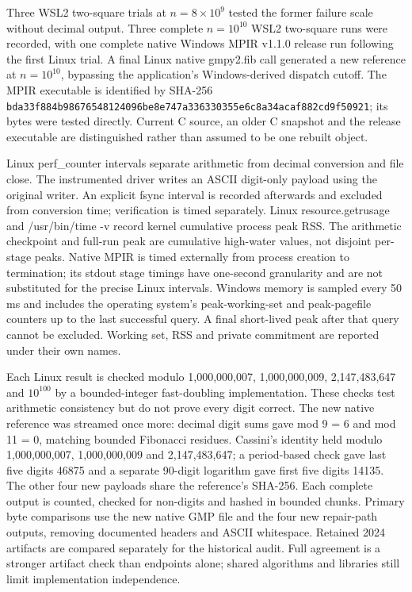 \documentclass[11pt,a4paper]{article}
\begin{document}
Three WSL2 two-square trials at $n=8\times 10^{9}$ tested the former failure scale without decimal output. Three complete $n=10^{10}$ WSL2 two-square runs were recorded, with one complete native Windows MPIR v1.1.0 release run following the first Linux trial. A final Linux native gmpy2.fib call generated a new reference at $n=10^{10}$, bypassing the application's Windows-derived dispatch cutoff. The MPIR executable is identified by SHA-256 \texttt{bda33f884b986765\allowbreak{}48124096be8e747a\allowbreak{}336330355e6c8a34\allowbreak{}acaf882cd9f50921}; its bytes were tested directly. Current C source, an older C snapshot and the release executable are distinguished rather than assumed to be one rebuilt object.

Linux perf\_\allowbreak{}counter intervals separate arithmetic from decimal conversion and file close. The instrumented driver writes an ASCII digit-only payload using the original writer. An explicit fsync interval is recorded afterwards and excluded from conversion time; verification is timed separately. Linux resource.getrusage and /usr/bin/time -v record kernel cumulative process peak RSS. The arithmetic checkpoint and full-run peak are cumulative high-water values, not disjoint per-stage peaks. Native MPIR is timed externally from process creation to termination; its stdout stage timings have one-second granularity and are not substituted for the precise Linux intervals. Windows memory is sampled every 50 ms and includes the operating system's peak-working-set and peak-pagefile counters up to the last successful query. A final short-lived peak after that query cannot be excluded. Working set, RSS and private commitment are reported under their own names.

Each Linux result is checked modulo 1,000,000,007, 1,000,000,009, 2,147,483,647 and $10^{100}$ by a bounded-integer fast-doubling implementation. These checks test arithmetic consistency but do not prove every digit correct. The new native reference was streamed once more: decimal digit sums gave mod 9 = 6 and mod 11 = 0, matching bounded Fibonacci residues. Cassini's identity held modulo 1,000,000,007, 1,000,000,009 and 2,147,483,647; a period-based check gave last five digits 46875 and a separate 90-digit logarithm gave first five digits 14135. The other four new payloads share the reference's SHA-256. Each complete output is counted, checked for non-digits and hashed in bounded chunks. Primary byte comparisons use the new native GMP file and the four new repair-path outputs, removing documented headers and ASCII whitespace. Retained 2024 artifacts are compared separately for the historical audit. Full agreement is a stronger artifact check than endpoints alone; shared algorithms and libraries still limit implementation independence.
\end{document}
